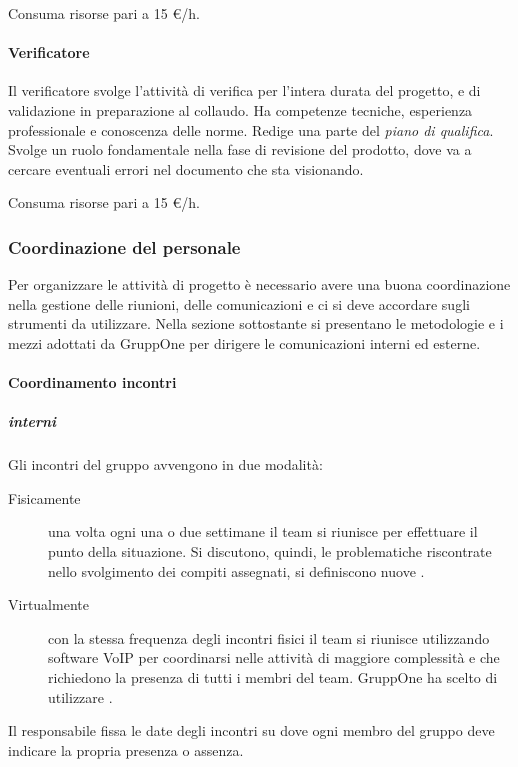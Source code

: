 \documentclass[../norme-di-progetto.tex]{subfiles}
\begin{document}
Consuma risorse pari a 15 €/h.

\paragraph{Verificatore}%
\label{par:verificatore}
Il verificatore svolge l'attività di verifica per l'intera durata del progetto, e di validazione in preparazione al collaudo.
Ha competenze tecniche, esperienza professionale e conoscenza delle norme. Redige una parte del \textit{piano di qualifica}.
Svolge un ruolo fondamentale nella fase di revisione del prodotto, dove va a cercare eventuali errori nel documento che sta visionando.

Consuma risorse pari a 15 €/h.

\subsubsection{Coordinazione del personale}%
\label{subs:coordinazione_del_personale}
Per organizzare le attività di progetto è necessario avere una buona coordinazione nella gestione delle riunioni, delle comunicazioni e ci si deve accordare sugli strumenti da utilizzare.
Nella sezione sottostante si presentano le metodologie e i mezzi adottati da GruppOne per dirigere le comunicazioni interni ed esterne.

\paragraph{Coordinamento incontri}%
\label{par:coordinamento_incontri}

\subparagraph{interni}%
\label{subp:coordinamento_incontri/interni}
Gli incontri del gruppo avvengono in due modalità:
\begin{description}
  \item [Fisicamente] una volta ogni una o due settimane il team si riunisce per effettuare il punto della situazione. Si discutono, quindi, le problematiche riscontrate nello svolgimento dei compiti assegnati, si definiscono nuove .
  \item [Virtualmente] con la stessa frequenza degli incontri fisici il team si riunisce utilizzando software VoIP per coordinarsi nelle attività di maggiore complessità e che richiedono la presenza di tutti i membri del team. GruppOne ha scelto di utilizzare .
\end{description}
Il responsabile fissa le date degli incontri su  dove ogni membro del gruppo deve indicare la propria presenza o assenza.
\end{document}

